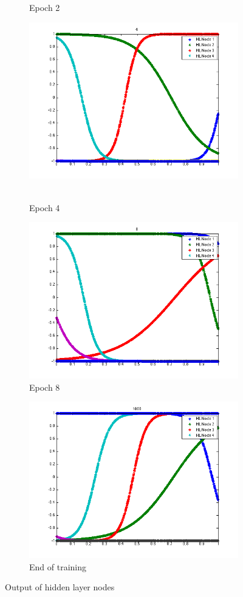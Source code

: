 \begin{figure}
\begin{subfigure}{.5\textwidth}
   \caption{Epoch 2}
  \end{subfigure}
  \begin{subfigure}{.5\textwidth}
  \centering
  \includegraphics[width=.8\linewidth]{Regression/univariate/hiddenLayer_4.png}\
  \caption{Epoch 4}
\end{subfigure}%
\begin{subfigure}{.5\textwidth}
  \centering
  \includegraphics[width=.8\linewidth]{Regression/univariate/hiddenLayer_8.png}
   \caption{Epoch 8}
  \end{subfigure}
  
  \begin{subfigure}{0.5\textwidth}
  \centering
  \includegraphics[width=0.8\linewidth]{Regression/univariate/hiddenLayer_1000.png}
   \caption{End of training}
  \end{subfigure}
  
\caption{Output of hidden layer nodes}
\end{figure}



